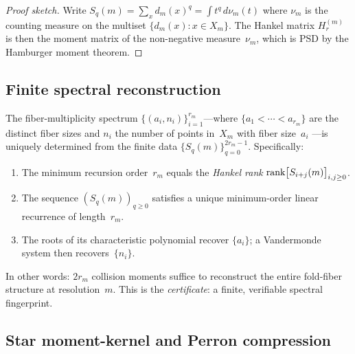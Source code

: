 \begin{proof}[Proof sketch]
Write $S_{q}(m) = \sum_{x} d_{m}(x)^{q}
= \int t^{q}\, d\nu_{m}(t)$ where $\nu_{m}$ is the counting
measure on the multiset $\{d_{m}(x) : x \in X_{m}\}$.
The Hankel matrix $H_{r}^{(m)}$ is then the moment matrix of the
non-negative measure~$\nu_{m}$, which is PSD by the
Hamburger moment theorem.
\end{proof}

\subsection{Finite spectral reconstruction}
\label{ssec:prony}

\begin{theorem}
\label{thm:prony}
The fiber-multiplicity spectrum
$\{(a_{i}, n_{i})\}_{i=1}^{r_{m}}$---where
$\{a_{1} < \cdots < a_{r_{m}}\}$ are the distinct fiber sizes
and $n_{i}$ the number of points in~$X_{m}$ with fiber size~$a_{i}$%
---is uniquely determined from the finite data
$\{S_{q}(m)\}_{q=0}^{2r_{m}-1}$.  Specifically:
\begin{enumerate}[label=(\roman*)]
\item The minimum recursion order~$r_{m}$ equals the
  \emph{Hankel rank}
  $\operatorname{rank}\bigl[S_{i+j}(m)\bigr]_{i,j \ge 0}$.
\item The sequence $(S_{q}(m))_{q \ge 0}$ satisfies a unique
  minimum-order linear recurrence of length~$r_{m}$.
\item The roots of its characteristic polynomial recover
  $\{a_{i}\}$; a Vandermonde system then recovers~$\{n_{i}\}$.
\end{enumerate}
\end{theorem}

In other words: $2r_{m}$ collision moments suffice to reconstruct
the entire fold-fiber structure at resolution~$m$.  This is the
\emph{certificate}: a finite, verifiable spectral fingerprint.

\subsection{Star moment-kernel and Perron compression}
\label{ssec:kernel}

